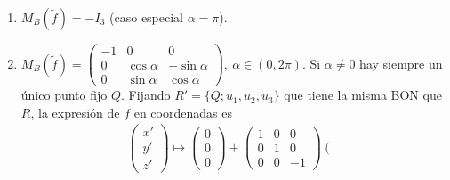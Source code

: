 \documentclass[14pt]{book}
\begin{document}
\begin{tm}
\begin{enumerate}
\begin{enumerate}
\begin{align*}
\begin{array}{c}
				\end{array}\right) \mapsto
				\left(\begin{array}{c}
				a_1 \\ a_2 \\ 0
				\end{array}\right) + 
				\left(\begin{array}{c}
				0 \\ 0 \\ a_3
				\end{array}\right) + 
				\left(\begin{array}{ccc}
				1 & 0 & 0 \\
				0 & 1 & 0 \\
				0 & 0 & -1
				\end{array}\right)\left(\begin{array}{c}
				x \\ y \\ z
				\end{array}\right)
			\end{align*}
			Así, $f$ es el resultado de una \textbf{simetría respecto a un plano con un deslizamiento} con un vector paralelo al plano.
			\item $M_B(\tilde{f}) = -I_3$ (caso especial $\alpha = \pi$).
			\item $M_B(\tilde{f}) = \left(\begin{array}{ccc}
			-1 & 0 & 0 \\
			0 & \cos \alpha & - \sin \alpha \\
			0 & \sin \alpha & \cos \alpha
			\end{array}\right),\ \alpha \in (0, 2\pi)$. Si $\alpha ≠ 0$ hay siempre un único punto fijo $Q$. Fijando $R' = \{Q; u_1, u_2, u_3\}$ que tiene la misma BON que $R$, la expresión de $f$ en coordenadas es
			\begin{align*}
				\left(\begin{array}{c}
				x' \\ y' \\ z'
				\end{array}\right) \mapsto
				\left(\begin{array}{c}
				0 \\ 0 \\ 0
				\end{array}\right)  + 
				\left(\begin{array}{ccc}
				1 & 0 & 0 \\
				0 & 1 & 0 \\
				0 & 0 & -1
				\end{array}\right)\left(\begin{array}{c}

\end{array}
\end{align*}
\end{enumerate}
\end{enumerate}
\end{tm}
\end{document}
